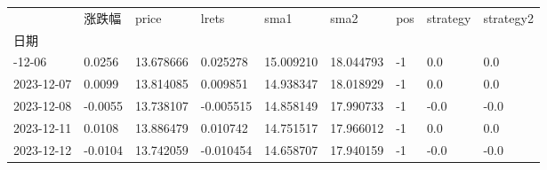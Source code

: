 \documentclass[
  letterpaper,
  DIV=11,
  numbers=noendperiod]{scrreprt}
\begin{document}
\begin{longtable}[]{@{}lllllllll@{}}
\toprule\noalign{}
& 涨跌幅 & price & lrets & sma1 & sma2 & pos & strategy & strategy2 \\
日期 & & & & & & & & \\
\midrule\noalign{}
\endhead
\bottomrule\noalign{}
\endlastfoot
2023-12-06 & 0.0256 & 13.678666 & 0.025278 & 15.009210 & 18.044793 & -1
& 0.0 & 0.0 \\
2023-12-07 & 0.0099 & 13.814085 & 0.009851 & 14.938347 & 18.018929 & -1
& 0.0 & 0.0 \\
2023-12-08 & -0.0055 & 13.738107 & -0.005515 & 14.858149 & 17.990733 &
-1 & -0.0 & -0.0 \\
2023-12-11 & 0.0108 & 13.886479 & 0.010742 & 14.751517 & 17.966012 & -1
& 0.0 & 0.0 \\
2023-12-12 & -0.0104 & 13.742059 & -0.010454 & 14.658707 & 17.940159 &
-1 & -0.0 & -0.0 \\
\end{longtable}
\end{document}
